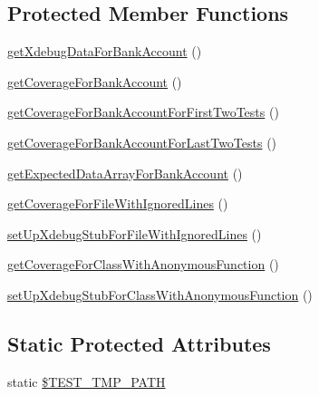 \subsection*{Protected Member Functions}
\begin{DoxyCompactItemize}
\item 
\mbox{\hyperlink{class_sebastian_bergmann_1_1_code_coverage_1_1_test_case_a29a7c2107cc49b8d45f63645588ef8f0}{get\+Xdebug\+Data\+For\+Bank\+Account}} ()
\item 
\mbox{\hyperlink{class_sebastian_bergmann_1_1_code_coverage_1_1_test_case_a618a3514393e79b13620ed4b7509ee9f}{get\+Coverage\+For\+Bank\+Account}} ()
\item 
\mbox{\hyperlink{class_sebastian_bergmann_1_1_code_coverage_1_1_test_case_ac4da347e8907e349e338c329f0913912}{get\+Coverage\+For\+Bank\+Account\+For\+First\+Two\+Tests}} ()
\item 
\mbox{\hyperlink{class_sebastian_bergmann_1_1_code_coverage_1_1_test_case_a1cb77707ff0747ebea9e37b745a51d37}{get\+Coverage\+For\+Bank\+Account\+For\+Last\+Two\+Tests}} ()
\item 
\mbox{\hyperlink{class_sebastian_bergmann_1_1_code_coverage_1_1_test_case_a80e9ae850e00a94c98650a9a5007a275}{get\+Expected\+Data\+Array\+For\+Bank\+Account}} ()
\item 
\mbox{\hyperlink{class_sebastian_bergmann_1_1_code_coverage_1_1_test_case_ab1b20db9c16a2b4fa176dfb1ab5f0742}{get\+Coverage\+For\+File\+With\+Ignored\+Lines}} ()
\item 
\mbox{\hyperlink{class_sebastian_bergmann_1_1_code_coverage_1_1_test_case_af944260de6ab5d810bd9310c041424fb}{set\+Up\+Xdebug\+Stub\+For\+File\+With\+Ignored\+Lines}} ()
\item 
\mbox{\hyperlink{class_sebastian_bergmann_1_1_code_coverage_1_1_test_case_ab68806866bb55a5b3a262a23bb770562}{get\+Coverage\+For\+Class\+With\+Anonymous\+Function}} ()
\item 
\mbox{\hyperlink{class_sebastian_bergmann_1_1_code_coverage_1_1_test_case_abf9b03b549425292067543c85b825dbc}{set\+Up\+Xdebug\+Stub\+For\+Class\+With\+Anonymous\+Function}} ()
\end{DoxyCompactItemize}
\subsection*{Static Protected Attributes}
\begin{DoxyCompactItemize}
\item 
static \mbox{\hyperlink{class_sebastian_bergmann_1_1_code_coverage_1_1_test_case_af333999c089e806148fd5b25a352cf81}{\$\+T\+E\+S\+T\+\_\+\+T\+M\+P\+\_\+\+P\+A\+TH}}
\end{DoxyCompactItemize}

